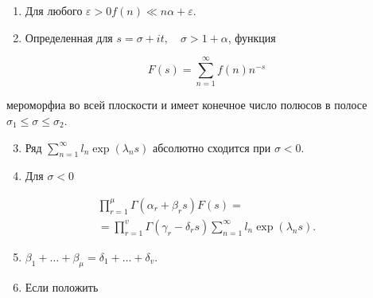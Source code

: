 \documentclass[10pt]{article}
\begin{document}
\begin{enumerate}

  \item Для любого $\varepsilon>0 f(n) \ll n \alpha+\varepsilon$.



  \item Определенная для $s=\sigma+i t, \quad \sigma>1+\alpha$, функция



\end{enumerate}



\[

F(s)=\sum_{n=1}^{\infty} f(n) n^{-s}

\]



мероморфиа во всей плоскости и имеет конечное число полюсов в полосе $\sigma_{1} \leqslant \sigma \leqslant \sigma_{2}$.



\begin{enumerate}

  \setcounter{enumi}{2}

  \item Ряд $\sum_{n=1}^{\infty} l_{n} \exp \left(\lambda_{n} s\right)$ абсолютно сходится при $\sigma<0$.



  \item Для $\sigma<0$



\end{enumerate}



\[

\begin{gathered}

\prod_{r=1}^{\mu} \Gamma\left(\alpha_{r}+\beta_{r} s\right) F(s)= \\

=\prod_{r=1}^{v} \Gamma\left(\gamma_{r}-\delta_{r} s\right) \sum_{n=1}^{\infty} l_{n} \exp \left(\lambda_{n} s\right) .

\end{gathered}

\]



\begin{enumerate}

  \setcounter{enumi}{4}

  \item $\beta_{1}+\ldots+\beta_{\mu}=\delta_{1}+\ldots+\delta_{v}$.



  \item Если положить



\end{enumerate}
\end{document}
